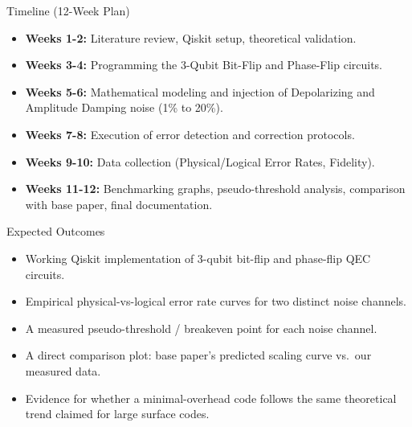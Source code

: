 \documentclass[aspectratio=169]{beamer}
\begin{document}
\begin{frame}{Timeline (12-Week Plan)}
\begin{itemize}
    \item \textbf{Weeks 1-2:} Literature review, Qiskit setup, theoretical validation.
    \item \textbf{Weeks 3-4:} Programming the 3-Qubit Bit-Flip and Phase-Flip circuits.
    \item \textbf{Weeks 5-6:} Mathematical modeling and injection of Depolarizing and Amplitude Damping noise (1\% to 20\%).
    \item \textbf{Weeks 7-8:} Execution of error detection and correction protocols.
    \item \textbf{Weeks 9-10:} Data collection (Physical/Logical Error Rates, Fidelity).
    \item \textbf{Weeks 11-12:} Benchmarking graphs, pseudo-threshold analysis, comparison with base paper, final documentation.
\end{itemize}
\end{frame}
\begin{frame}{Expected Outcomes}
\begin{itemize}
    \item Working Qiskit implementation of 3-qubit bit-flip and phase-flip QEC circuits.
    \item Empirical physical-vs-logical error rate curves for two distinct noise channels.
    \item A measured pseudo-threshold / breakeven point for each noise channel.
    \item A direct comparison plot: base paper's predicted scaling curve vs.\ our measured data.
    \item Evidence for whether a minimal-overhead code follows the same theoretical trend claimed for large surface codes.
\end{itemize}
\end{frame}
\end{document}
